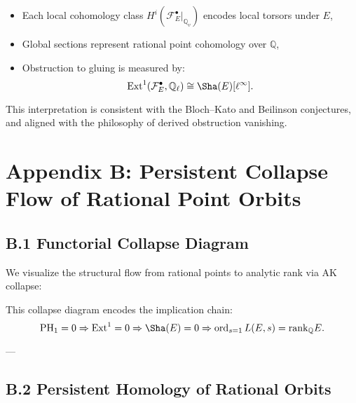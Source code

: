 \documentclass[11pt]{article}
\theoremstyle{definition}
\begin{document}
\begin{itemize}
    \item Each local cohomology class \( H^i(\mathcal{F}_E^\bullet|_{\mathbb{Q}_v}) \) encodes local torsors under \( E \),
    \item Global sections represent rational point cohomology over \( \mathbb{Q} \),
    \item Obstruction to gluing is measured by:
    \[
    \mathrm{Ext}^1(\mathcal{F}_E^\bullet, \mathbb{Q}_\ell) \cong \Sha(E)[\ell^\infty].
    \]
\end{itemize}

This interpretation is consistent with the Bloch–Kato and Beilinson conjectures, and aligned with the philosophy of derived obstruction vanishing.


\section*{Appendix B: Persistent Collapse Flow of Rational Point Orbits}

\subsection*{B.1 Functorial Collapse Diagram}

We visualize the structural flow from rational points to analytic rank via AK collapse:

\begin{center}
\end{center}

\medskip

This collapse diagram encodes the implication chain:
\[
\mathrm{PH}_1 = 0 \Rightarrow \mathrm{Ext}^1 = 0 \Rightarrow \Sha(E) = 0 \Rightarrow \operatorname{ord}_{s=1}L(E,s) = \mathrm{rank}_\mathbb{Q}E.
\]

---

\subsection*{B.2 Persistent Homology of Rational Orbits}
\end{document}
